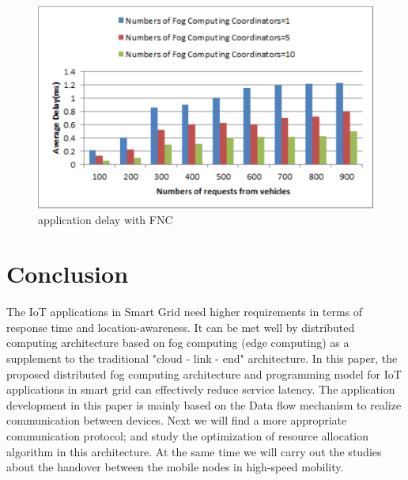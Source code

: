 \documentclass[conference]{IEEEtran}
\begin{document}
\begin{figure}[h]
	\centering\includegraphics[width=3.4 in]{figures/Fig_6_FCN} 
	\caption{application delay with FNC}\label{fig:Fig_6_FCN} %
\end{figure}


\section{Conclusion}
The IoT applications in Smart Grid need higher requirements in terms of response time and location-awareness. It can be met well by distributed computing architecture based on fog computing (edge computing) as a supplement to the traditional "cloud - link - end" architecture. In this paper, the proposed distributed fog computing architecture and programming model for IoT applications in smart grid can effectively reduce service latency. The application development in this paper is mainly based on the Data flow mechanism to realize communication between devices. Next we will find a more appropriate communication protocol; and study the optimization of resource allocation algorithm in this architecture. At the same time we will carry out the studies about the handover between the mobile nodes in high-speed mobility.





\renewcommand\refname{Reference}


\end{document}
